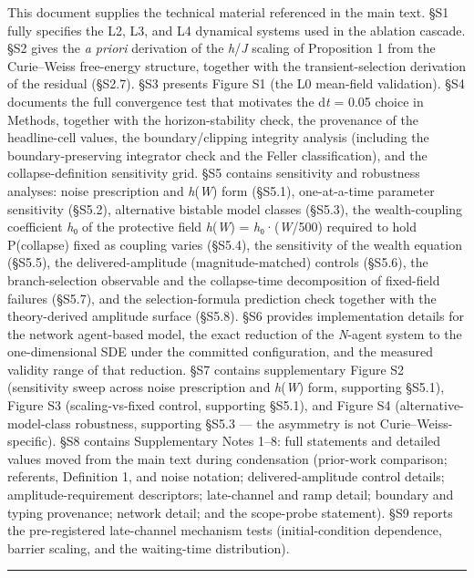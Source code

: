 \documentclass[11pt,letterpaper]{article}
\begin{document}
This document supplies the technical material referenced in the main text. §S1 fully specifies the L2, L3, and L4 dynamical systems used in the ablation cascade. §S2 gives the \emph{a priori} derivation of the \emph{h}/\emph{J} scaling of Proposition 1 from the Curie--Weiss free-energy structure, together with the transient-selection derivation of the residual (§S2.7). §S3 presents Figure S1 (the L0 mean-field validation). §S4 documents the full convergence test that motivates the d\emph{t} = 0.05 choice in Methods, together with the horizon-stability check, the provenance of the headline-cell values, the boundary/clipping integrity analysis (including the boundary-preserving integrator check and the Feller classification), and the collapse-definition sensitivity grid. §S5 contains sensitivity and robustness analyses: noise prescription and \emph{h}(\emph{W}) form (§S5.1), one-at-a-time parameter sensitivity (§S5.2), alternative bistable model classes (§S5.3), the wealth-coupling coefficient \emph{h}₀ of the protective field \emph{h}(\emph{W}) = \emph{h}₀·(\emph{W}/500) required to hold P(collapse) fixed as coupling varies (§S5.4), the sensitivity of the wealth equation (§S5.5), the delivered-amplitude (magnitude-matched) controls (§S5.6), the branch-selection observable and the collapse-time decomposition of fixed-field failures (§S5.7), and the selection-formula prediction check together with the theory-derived amplitude surface (§S5.8). §S6 provides implementation details for the network agent-based model, the exact reduction of the \emph{N}-agent system to the one-dimensional SDE under the committed configuration, and the measured validity range of that reduction. §S7 contains supplementary Figure S2 (sensitivity sweep across noise prescription and \emph{h}(\emph{W}) form, supporting §S5.1), Figure S3 (scaling-vs-fixed control, supporting §S5.1), and Figure S4 (alternative-model-class robustness, supporting §S5.3 --- the asymmetry is not Curie--Weiss-specific). §S8 contains Supplementary Notes 1--8: full statements and detailed values moved from the main text during condensation (prior-work comparison; referents, Definition 1, and noise notation; delivered-amplitude control details; amplitude-requirement descriptors; late-channel and ramp detail; boundary and typing provenance; network detail; and the scope-probe statement). §S9 reports the pre-registered late-channel mechanism tests (initial-condition dependence, barrier scaling, and the waiting-time distribution).

\begin{center}\rule{0.5\linewidth}{0.5pt}\end{center}
\end{document}
